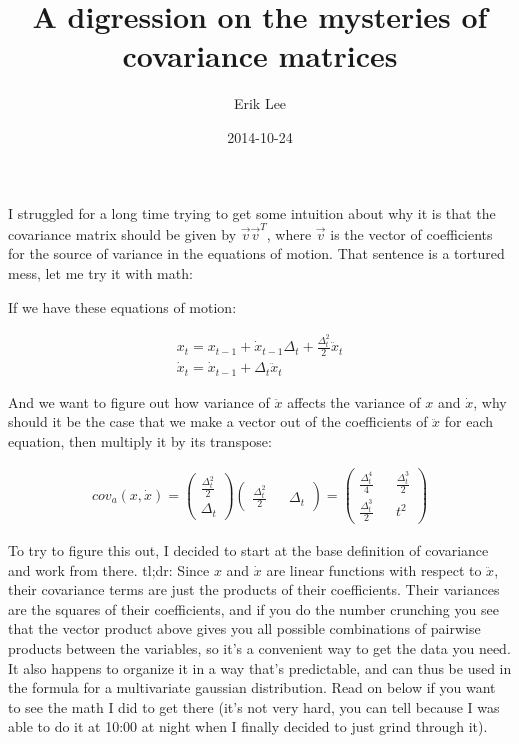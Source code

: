 \documentclass{article}
\author{Erik Lee}
\date{2014-10-24}
\title{A digression on the mysteries of covariance matrices}
\begin{document}
\maketitle

I struggled for a long time trying to get some intuition about why it is that
the covariance matrix should be given by $\vec{v} \vec{v}^T$, where $\vec{v}$ is
the vector of coefficients for the source of variance in the equations of
motion. That sentence is a tortured mess, let me try it with math:

If we have these equations of motion:

\begin{gather}
  x_t = x_{t-1} + \dot{x}_{t-1} \Delta_t + \frac{\Delta_t^2}{2} \ddot{x}_t \\
  \dot{x}_t = \dot{x}_{t-1} + \Delta_t \ddot{x}_t
\end{gather}

And we want to figure out how variance of $\ddot{x}$ affects the variance of $x$
and $\dot{x}$, why should it be the case that we make a vector out of the
coefficients of $\ddot{x}$ for each equation, then multiply it by its transpose:

\begin{gather}
cov_a(x,\dot{x}) = \begin{pmatrix}\frac{\Delta_t^2}{2} \\ \Delta_t\end{pmatrix}
\begin{pmatrix}\frac{\Delta_t^2}{2} && \Delta_t\end{pmatrix} =
\begin{pmatrix}\frac{\Delta_t^4}{4} && \frac{\Delta_t^3}{2} \\
\frac{\Delta_t^3}{2} && t^2 \end{pmatrix}
\end{gather}

To try to figure this out, I decided to start at the base definition of
covariance and work from there. tl;dr: Since $x$ and $\dot{x}$ are linear
functions with respect to $\ddot{x}$, their covariance terms are just the
products of their coefficients. Their variances are the squares of their
coefficients, and if you do the number crunching you see that the vector product
above gives you all possible combinations of pairwise products between the
variables, so it's a convenient way to get the data you need. It also happens to
organize it in a way that's predictable, and can thus be used in the formula for
a multivariate gaussian distribution. Read on below if you want to see the math
I did to get there (it's not very hard, you can tell because I was able to do it
at 10:00 at night when I finally decided to just grind through it).
\end{document}
